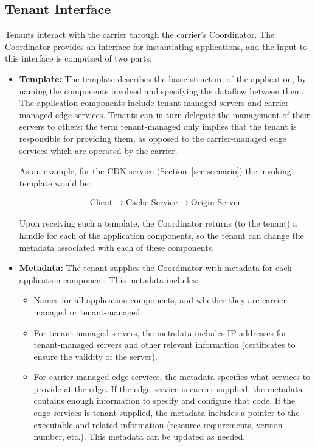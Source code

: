 \subsection{Tenant Interface}
Tenants interact with the carrier through the carrier's Coordinator. The Coordinator provides an interface for instantiating applications, and the input to this interface is comprised of two parts:
\begin{itemize}
\item {\bf Template:} The template describes the basic structure of the application, by naming the components involved and specifying the dataflow between them. The application components include tenant-managed servers and carrier-managed edge services. Tenants can in turn delegate the management of their servers to others: the term tenant-managed only implies that the tenant is responsible for providing them, as opposed to the carrier-managed edge services which are operated by the carrier.  

As an example, for the CDN service (Section~\ref{sec:scenario}) the invoking template would be:

\vspace{-1.2em}
\begin{align*}
\text{Client} \rightarrow \text{Cache Service} \rightarrow \text{Origin Server}
\end{align*}

Upon receiving such a template, the Coordinator returns (to the tenant) a handle for each of the application components, so the tenant can change the metadata associated with each of these components.

\item {\bf Metadata:} The tenant supplies the Coordinator with metadata for each application component. This metadata includes:
\begin{itemize}
\item Names for all application components, and whether they are carrier-managed or tenant-managed
\item For tenant-managed servers, the metadata includes IP addresses for tenant-managed servers and other relevant information (\eg certificates to ensure the validity of the server).
\item For carrier-managed edge services, the metadata specifies what services to provide at the edge. If the edge service is carrier-supplied, the metadata contains enough information to specify and configure that code. If the edge services is tenant-supplied, the metadata includes a pointer to the executable and related information (resource requirements, version number, etc.). This metadata can be updated as needed.

\end{itemize}
\end{itemize}

